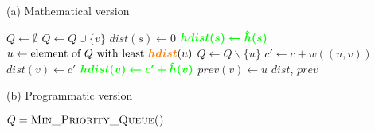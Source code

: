 \documentclass{report}[a4paper]
\theoremstyle{remark}
\begin{document}
\begin{center}
    \begin{algorithm}[H]
        \caption[A* algorithm]{A* algorithm\\Added lines in green, changed expressions in orange, relative to Dijkstra's algorithm (Algorithm \ref{alg-dijkstra})}
        \label{alg-astar}
        \begin{minipage}[t]{0.49\linewidth}
            (a) Mathematical version
            \begin{algorithmic}[1]
                    \State $Q \gets \emptyset$
                        \State $Q \gets Q \cup \{v\}$
                    \EndFor
                    \State $dist(s) \gets 0$
                    \State $\textcolor{green}{\bm{hdist(s) \gets \hat{h}(s)}}$
                        \State $u \gets \text{element of } Q \text{ with least } \textcolor{orange}{\bm{hdist}}(u)$
                        \State $Q \gets Q \backslash \{u\}$
                            \State $c' \gets c + w((u, v))$
                                \State $dist(v) \gets c'$
                                \State $\textcolor{green}{\bm{hdist(v) \gets c'+\hat{h}(v)}}$
                                \State $prev(v) \gets u$
                            \EndIf
                        \EndFor
                    \EndWhile
                    \Return $dist$, $prev$
                \EndProcedure
            \end{algorithmic}
        \end{minipage}
        \begin{minipage}[t]{0.49\linewidth}
            (b) Programmatic version
            \begin{algorithmic}[1]
                    \State $Q = \textsc{Min\_Priority\_Queue()}$

\end{algorithmic}
\end{minipage}
\end{algorithm}
\end{center}
\end{document}
